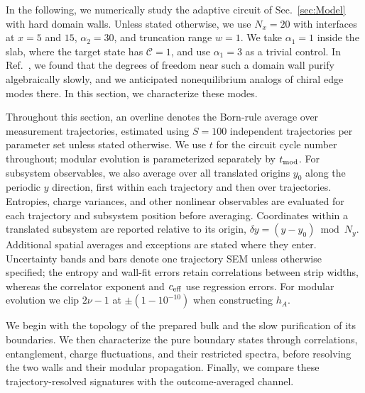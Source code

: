 \documentclass[aps,prb,10pt,twocolumn,superscriptaddress,longbibliography,floatfix]{revtex4-2}
\newcommand{\mc}[1]{\mathcal{#1}}
\begin{document}
In the following, we numerically study the adaptive circuit of Sec.~\ref{sec:Model} with hard domain walls. Unless stated otherwise, we use $N_x=20$ with interfaces at $x=5$ and $15$, $\alpha_2=30$, and truncation range $w=1$. We take $\alpha_1=1$ inside the slab, where the target state has $\mc C=1$, and use $\alpha_1=3$ as a trivial control. In Ref.~\cite{BhuiyanPanJian2026}, we found that the degrees of freedom near such a domain wall purify algebraically slowly, and we anticipated nonequilibrium analogs of chiral edge modes there. In this section, we characterize these modes.
{\color{blue}
Throughout this section, an overline denotes the Born-rule average over measurement trajectories, estimated using $S=100$ independent trajectories per parameter set unless stated otherwise. We use $t$ for the circuit cycle number throughout; modular evolution is parameterized separately by $t_{\rm mod}$. For subsystem observables, we also average over all translated origins $y_0$ along the periodic $y$ direction, first within each trajectory and then over trajectories. Entropies, charge variances, and other nonlinear observables are evaluated for each trajectory and subsystem position before averaging. Coordinates within a translated subsystem are reported relative to its origin, $\delta y=(y-y_0)\bmod N_y$. Additional spatial averages and exceptions are stated where they enter. Uncertainty bands and bars denote one trajectory SEM unless otherwise specified; the entropy and wall-fit errors retain correlations between strip widths, whereas the correlator exponent and $c_{\rm eff}$ use regression errors. For modular evolution we clip $2\nu-1$ at $\pm(1-10^{-10})$ when constructing $h_A$.

 We begin with the topology of the prepared bulk and the slow purification of its boundaries. We then characterize the pure boundary states through correlations, entanglement, charge fluctuations, and their restricted spectra, before resolving the two walls and their modular propagation. Finally, we compare these trajectory-resolved signatures with the outcome-averaged channel.
}
\end{document}

